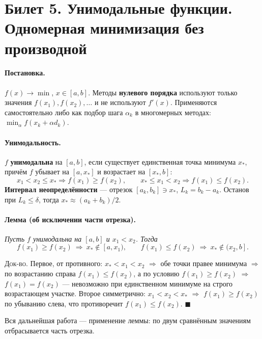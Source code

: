 \section{Билет 5. Унимодальные функции. Одномерная минимизация без производной}


\paragraph{Постановка.}
$f(x) \to \min$, $x \in [a,b]$. Методы \textbf{нулевого порядка} используют
только значения $f(x_1), f(x_2), \dots$ и не используют $f'(x)$. Применяются
самостоятельно либо как подбор шага $\alpha_k$ в многомерных методах:
$\min_\alpha f(x_k + \alpha d_k)$.

\paragraph{Унимодальность.}
$f$ \textbf{унимодальна} на $[a,b]$, если существует единственная точка
минимума $x_*$, причём $f$ убывает на $[a, x_*]$ и возрастает на $[x_*, b]$:
\[
  x_1 < x_2 \le x_* \Rightarrow f(x_1) \ge f(x_2) ,
  \qquad
  x_* \le x_1 < x_2 \Rightarrow f(x_1) \le f(x_2) .
\]
\textbf{Интервал неопределённости} — отрезок $[a_k, b_k] \ni x_*$,
$L_k = b_k - a_k$. Останов при $L_k \le \delta$, тогда
$x_* \approx (a_k + b_k)/2$.

\paragraph{Лемма (об исключении части отрезка).}
\textit{Пусть $f$ унимодальна на $[a,b]$ и $x_1 < x_2$. Тогда}
\[
  f(x_1) \ge f(x_2) \ \Rightarrow\ x_* \notin [a, x_1) ,
  \qquad
  f(x_1) \le f(x_2) \ \Rightarrow\ x_* \notin (x_2, b] .
\]

\textsc{Док-во.} Первое, от противного: $x_* < x_1 < x_2$ $\Rightarrow$ обе
точки правее минимума $\Rightarrow$ по возрастанию справа
$f(x_1) \le f(x_2)$, а по условию $f(x_1) \ge f(x_2)$ $\Rightarrow$
$f(x_1) = f(x_2)$ — невозможно при единственном минимуме на строго
возрастающем участке. Второе симметрично: $x_1 < x_2 < x_*$ $\Rightarrow$
$f(x_1) \ge f(x_2)$ по убыванию слева, что противоречит
$f(x_1) \le f(x_2)$. $\blacksquare$

Вся дальнейшая работа — применение леммы: по двум сравнённым значениям
отбрасывается часть отрезка.

